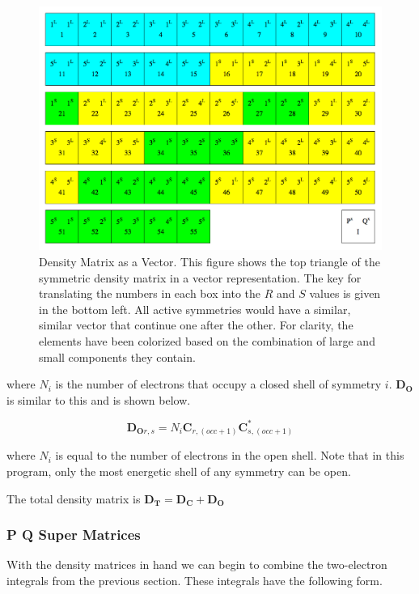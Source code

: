 \documentclass[12pt]{report}
\begin{document}
\begin{figure}
\includegraphics[width=1\textwidth]{Figures/dtmx_vec.png}
\caption[Density Matrix as a Vector]
{Density Matrix as a Vector. This figure shows the top triangle of the symmetric density matrix in a vector representation. The key for translating the numbers in each box into the $R$ and $S$ values is given in the bottom left. All active symmetries would have a similar, similar vector that continue one after the other. For clarity, the elements have been colorized based on the combination of large and small components they contain.}
\label{fig:dtmxvec}
\end{figure}


where $N_{i}$ is the number of electrons that occupy a closed shell of symmetry $i$. \textbf{D$_\textbf{O}$} is similar to this and is shown below.

\begin{equation}
\label{RDOMX}
\textbf{D$_{\textbf{O}r,s}$} =N_{i}\textbf{C}_{r,(occ+1)}\textbf{C}^{*}_{s,(occ+1)}
\end{equation}

where $N_{i}$ is equal to the number of electrons in the open shell. Note that in this program, only the most energetic shell of any symmetry can be open.

The total density matrix is $\textbf{D$_{\textbf{T}}$} =  \textbf{D$_{\textbf{C}}$} + \textbf{D$_{\textbf{O}}$}$

\subsubsection{P Q Super Matrices}
\label{sec:PQmeth}
With the density matrices in hand we can begin to combine the two-electron integrals from the previous section. These integrals have the following form.
\end{document}
